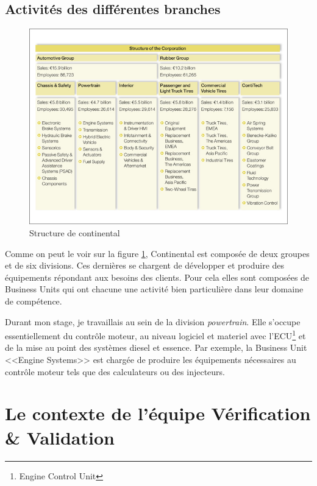 		\subsection{Activités des différentes branches}
		\begin{figure}[H]
			\centering
			\includegraphics[width=18cm]{contents/images/structureConti.jpg}
			\caption{Structure de continental}
			\label{fig:structConti}
		\end{figure}

		Comme on peut le voir sur la figure \ref{fig:structConti}, Continental est composée de deux groupes et de six divisions. Ces dernières se chargent de développer et produire des équipements répondant aux besoins des clients. Pour cela elles sont composées de Business Units qui ont chacune une activité bien particulière dans leur domaine de compétence. 

Durant mon stage, je travaillais au sein de la division \textit{powertrain}. Elle s'occupe essentiellement du contrôle moteur, au niveau logiciel et materiel avec l'ECU\footnote{Engine Control Unit} et de la mise au point des systèmes diesel et essence. Par exemple, la Business Unit <<Engine Systems>> est chargée de produire les équipements nécessaires au contrôle moteur tels que des calculateurs ou des 
injecteurs.

	\section{Le contexte de l'équipe Vérification \& Validation}
